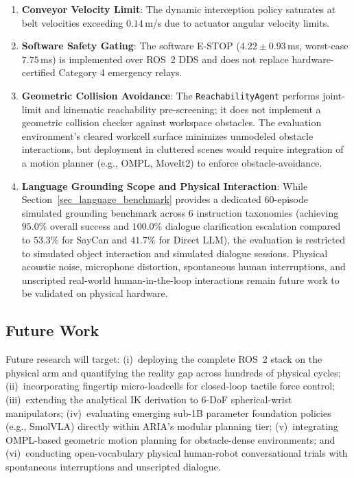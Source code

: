 \documentclass[journal]{IEEEtran}
\begin{document}
\begin{enumerate}
    \item \textbf{Conveyor Velocity Limit}: The dynamic interception policy saturates at belt velocities exceeding $0.14$\,m/s due to actuator angular velocity limits.
    \item \textbf{Software Safety Gating}: The software E-STOP ($4.22 \pm 0.93$\,ms, worst-case $7.75$\,ms) is implemented over ROS~2 DDS and does not replace hardware-certified Category 4 emergency relays.
    \item \textbf{Geometric Collision Avoidance}: The \texttt{ReachabilityAgent} performs joint-limit and kinematic reachability pre-screening; it does not implement a geometric collision checker against workspace obstacles. The evaluation environment's cleared workcell surface minimizes unmodeled obstacle interactions, but deployment in cluttered scenes would require integration of a motion planner (e.g., OMPL, MoveIt2) to enforce obstacle-avoidance.
    \item \textbf{Language Grounding Scope and Physical Interaction}: While Section~\ref{sec_language_benchmark} provides a dedicated 60-episode simulated grounding benchmark across 6 instruction taxonomies (achieving $95.0\%$ overall success and $100.0\%$ dialogue clarification escalation compared to $53.3\%$ for SayCan and $41.7\%$ for Direct LLM), the evaluation is restricted to simulated object interaction and simulated dialogue sessions. Physical acoustic noise, microphone distortion, spontaneous human interruptions, and unscripted real-world human-in-the-loop interactions remain future work to be validated on physical hardware.
\end{enumerate}

\subsection{Future Work}
Future research will target: (i)~deploying the complete ROS~2 stack on the physical arm and quantifying the reality gap across hundreds of physical cycles; (ii)~incorporating fingertip micro-loadcells for closed-loop tactile force control; (iii)~extending the analytical IK derivation to 6-DoF spherical-wrist manipulators; (iv)~evaluating emerging sub-1B parameter foundation policies (e.g., SmolVLA) directly within ARIA's modular planning tier; (v)~integrating OMPL-based geometric motion planning for obstacle-dense environments; and (vi)~conducting open-vocabulary physical human-robot conversational trials with spontaneous interruptions and unscripted dialogue.
\end{document}
